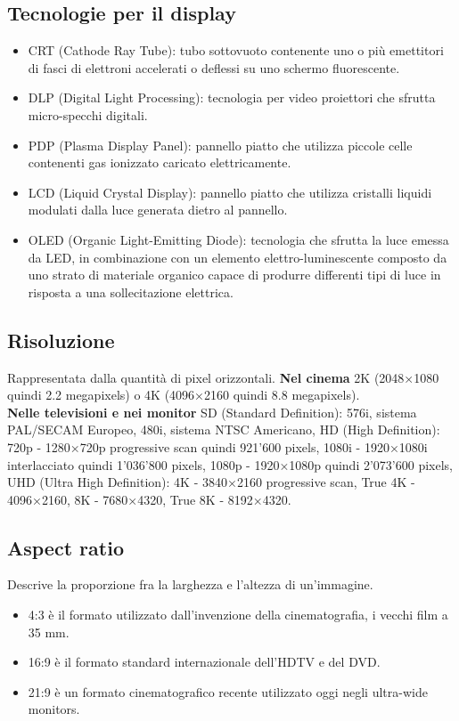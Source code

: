 \documentclass[8pt,a4paper]{article}
\begin{document}
\begin{multicols}{5}
    \subsection{Tecnologie per il display}
    \begin{itemize}
      \item CRT (Cathode Ray Tube): tubo sottovuoto contenente uno o più emettitori 
      di fasci di elettroni accelerati o deflessi su uno schermo fluorescente.
      \item DLP (Digital Light Processing): tecnologia per video proiettori che 
      sfrutta micro-specchi digitali.
      \item PDP (Plasma Display Panel): pannello piatto che utilizza piccole celle 
      contenenti gas ionizzato caricato elettricamente.
      \item LCD (Liquid Crystal Display): pannello piatto che utilizza cristalli liquidi 
      modulati dalla luce generata dietro al pannello. 
      \item OLED (Organic Light-Emitting Diode): tecnologia che sfrutta la luce emessa 
      da LED, in combinazione con un elemento elettro-luminescente composto da uno 
      strato di materiale organico capace di produrre differenti tipi di luce in 
      risposta a una sollecitazione elettrica.
    \end{itemize}
    \subsection{Risoluzione}
    Rappresentata dalla quantità di pixel orizzontali. 
      \textbf{Nel cinema} 2K (2048×1080 quindi 2.2 megapixels) o 4K (4096×2160 quindi 
      8.8 megapixels). \\
      \textbf{Nelle televisioni e nei monitor} SD (Standard Definition): 576i, sistema 
      PAL/SECAM Europeo, 480i, sistema NTSC Americano, HD (High Definition): 720p - 
      1280×720p progressive scan quindi 921’600 pixels, 1080i - 1920×1080i interlacciato 
      quindi 1’036’800 pixels, 1080p - 1920×1080p quindi 2’073’600 pixels, UHD (Ultra 
      High Definition): 4K - 3840×2160 progressive scan, True 4K - 4096×2160, 8K - 
      7680×4320, True 8K - 8192×4320.
    \subsection{Aspect ratio}
    Descrive la proporzione fra la larghezza e l’altezza di un’immagine.
    \begin{itemize}
      \item 4:3 è il formato utilizzato dall’invenzione della cinematografia, i vecchi 
      film a 35 mm.
      \item 16:9 è il formato standard internazionale dell’HDTV e del DVD.
      \item 21:9 è un formato cinematografico recente utilizzato oggi negli 
      ultra-wide monitors.
    \end{itemize}
    

\end{multicols}
\end{document}
